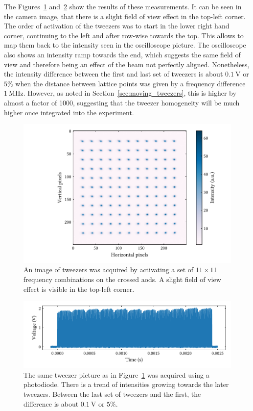 The Figures~\ref{fig:aod_grid} and~\ref{fig:aod_hom} show the results of these measurements. It can be seen in the camera image, that there is a slight field of view effect in the top-left corner. The order of activation of the tweezers was to start in the lower right hand corner, continuing to the left and after row-wise towards the top. This allows to map them back to the intensity seen in the oscilloscope picture. The oscilloscope also shows an intensity ramp towards the end, which suggests the same field of view and therefore being an effect of the beam not perfectly aligned. Nonetheless, the intensity difference between the first and last set of tweezers is about $\SI{0.1}{\volt}$ or $5\%$ when the distance between lattice points was given by a frequency difference $\SI{1}{\mega\hertz}$. However, as noted in Section~\ref{sec:moving_tweezers}, this is higher by almost a factor of 1000, suggesting that the tweezer homogeneity will be much higher once integrated into the experiment.

\begin{figure}[t]%
\centering
\includegraphics{figures/aod_grid_155.pdf}
\caption{An image of tweezers was acquired by activating a set of $11\times11$ frequency combinations on the crossed \acp{aod}. A slight field of view effect is visible in the top-left corner.}%
\label{fig:aod_grid}
\end{figure}

\begin{figure}[t]%
\centering
\includegraphics{figures/aod_hom_155.pdf}
\caption{The same tweezer picture as in Figure~\ref{fig:aod_grid} was acquired using a photodiode. There is a trend of intensities growing towards the later tweezers. Between the last set of tweezers and the first, the difference is about $\SI{0.1}{\volt}$ or $5\%$.}%
\label{fig:aod_hom}
\end{figure}

